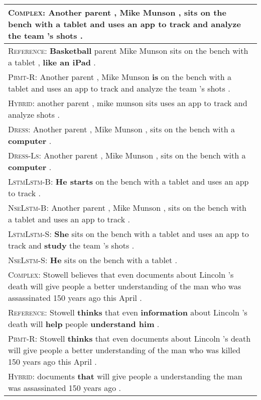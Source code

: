 \documentclass[11pt,a4paper]{article}
\begin{document}
\begin{table*}[ht!]
\centering
\begin{adjustbox}{max width=\textwidth}
\begin{tabular}{|p{21cm}|}
 \hline
\textsc{Complex}: Another parent , Mike Munson , sits on the bench with a tablet and uses an app to track and analyze the team 's shots . \\
  \hline
\textsc{Reference}: \textbf{Basketball} parent Mike Munson sits on the bench with a tablet , \textbf{like an iPad} .\\
  \hline
  \textsc{Pbmt-R}: Another parent , Mike Munson \textbf{is} on the bench with a tablet and uses an app to track and analyze the team 's shots .\\
  \hline
  \textsc{Hybrid}: another parent , mike munson sits uses an app to track and analyze shots .\\
  \hline
  \textsc{Dress}: Another parent , Mike Munson , sits on the bench with a \textbf{computer} .\\
  \hline
  \textsc{Dress-Ls}: Another parent , Mike Munson , sits on the bench with a \textbf{computer} .\\
  \hline
  \textsc{LstmLstm-B}: \textbf{He starts} on the bench with a tablet and uses an app to track .\\
  \hline
  \textsc{NseLstm-B}: Another parent , Mike Munson , sits on the bench with a tablet and uses an app to track .\\
  \hline
    \textsc{LstmLstm-S}: \textbf{She} sits on the bench with a tablet and uses an app to track and \textbf{study} the team 's shots .\\
  \hline
    \textsc{NseLstm-S}: \textbf{He} sits on the bench with a tablet .\\
  \hline
\hline
\textsc{Complex}: Stowell believes that even documents about Lincoln 's death will give people a better understanding of the man who was assassinated 150 years ago this April . \\
  \hline
\textsc{Reference}: Stowell \textbf{thinks} that even \textbf{information} about Lincoln 's death will \textbf{help} people \textbf{understand him} .\\
  \hline
  \textsc{Pbmt-R}: Stowell \textbf{thinks} that even documents about Lincoln 's death will give people a better understanding of the man who was killed 150 years ago this April .\\
  \hline
  \textsc{Hybrid}: documents \textbf{that} will give people a understanding the man was assassinated 150 years ago .\\

\end{tabular}
\end{adjustbox}
\end{table*}
\end{document}
